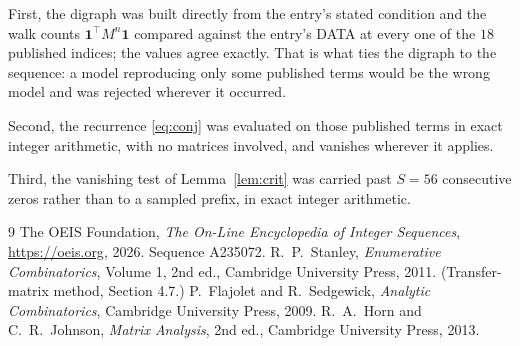\documentclass[11pt,a4paper]{article}
\theoremstyle{plain}
\theoremstyle{definition}
\begin{document}
First, the digraph was built directly from the entry's stated condition and the walk counts
$\mathbf{1}^{\!\top}M^{n}\mathbf{1}$ compared against the entry's DATA at every one of
the $18$ published indices; the values agree exactly. That is what ties the digraph to
the sequence: a model reproducing only some published terms would be the wrong model and
was rejected wherever it occurred.

Second, the recurrence \eqref{eq:conj} was evaluated on those published terms in exact
integer arithmetic, with no matrices involved, and vanishes wherever it applies.

Third, the vanishing test of Lemma~\ref{lem:crit} was carried past $S=56$ consecutive
zeros rather than to a sampled prefix, in exact integer arithmetic.

\begin{thebibliography}{9}
 The OEIS Foundation, \emph{The On-Line Encyclopedia of Integer
Sequences}, \url{https://oeis.org}, 2026. Sequence A235072.
 R.~P.~Stanley, \emph{Enumerative Combinatorics}, Volume 1, 2nd ed.,
Cambridge University Press, 2011. (Transfer-matrix method, Section 4.7.)
 P.~Flajolet and R.~Sedgewick, \emph{Analytic Combinatorics}, Cambridge
University Press, 2009.
 R.~A.~Horn and C.~R.~Johnson, \emph{Matrix Analysis}, 2nd ed., Cambridge
University Press, 2013.
\end{thebibliography}
\end{document}
